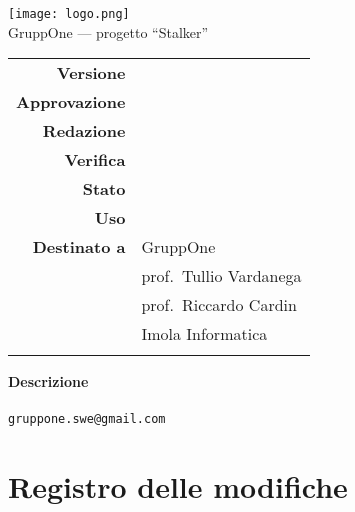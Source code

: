 \thispagestyle{empty}

\begin{center}

  \texttt{[image: logo.png]}\\
  {\Large GruppOne --- progetto ``Stalker''}\\
  \vspace{1.5cm}

  {\Huge \thetitle}
  \vspace{1.5cm}

  \begin{table}[H]
    \centering

    \begin{tabular}{r|l} %
      \textbf{Versione}                   & \versione{}             \\
      \textbf{Approvazione}               & \responsabile{}         \\
      \textbf{Redazione}                  & \redattori{}            \\
      \textbf{Verifica}                   & \verificatori{}         \\
      \textbf{Stato}                      & \stato{}                \\
      \textbf{Uso}                        & \uso{}                  \\
      \textbf{Destinato a}
                                          & GruppOne                \\
                                          & prof.\ Tullio Vardanega \\
                                          & prof.\ Riccardo Cardin  \\
      \ifthenelse{\equal{\uso}{Esterno}}{ & Imola Informatica       \\ }{}
    \end{tabular}
  \end{table}

  \vspace{3cm}
  \textbf{Descrizione}\\
  \descrizione{}\\
  \vfill
  \verb|gruppone.swe@gmail.com|
\end{center}

\newpage
\thispagestyle{nopage}

\section*{Registro delle modifiche}%
\label{sec:registro_delle_modifiche}

